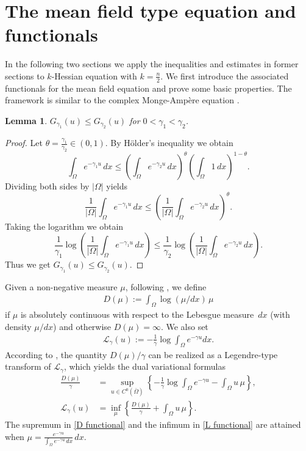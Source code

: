 \documentclass[11pt]{amsart}
\numberwithin{equation}{section}
\newtheorem{lemma}[theorem]{Lemma}
\numberwithin{equation}{section}
\begin{document}
\vskip 20pt

\section{The mean field type equation and functionals}\label{mean-field eq}

In the following two sections we apply the inequalities and estimates in former sections to 
$k$-Hessian equation with $k=\frac{n}{2}$. We first introduce the associated functionals for the mean field equation and prove some basic properties. The framework is similar to the complex Monge-Amp\`ere equation \cite{BB}.

\begin{lemma}\label{increase of G}
$G_{\gamma_1}(u)\le G_{\gamma_2}(u)$ for $0 <\gamma_1 < \gamma_2$.
\end{lemma}
\begin{proof}
 Let $\theta = \frac{\gamma_1}{\gamma_2} \in (0,1)$. 
	By H\"older's inequality  we obtain
	\[
	\int_\Omega e^{-\gamma_1 u}\, dx
	\le \left( \int_\Omega e^{-\gamma_2 u}\, dx \right)^\theta \left( \int_\Omega 1\, dx \right)^{1-\theta}.
	\]
	Dividing both sides by $|\Omega|$ yields
	\[
	\frac{1}{|\Omega|} \int_\Omega e^{-\gamma_1 u}\, dx  \le \left( \frac{1}{|\Omega|} \int_\Omega e^{-\gamma_2 u}\,dx  \right)^\theta.
	\]
	Taking the logarithm we obtain
	\[
	\frac{1}{\gamma_1} \log\left( \frac{1}{|\Omega|} \int_\Omega e^{-\gamma_1 u}\,dx  \right) \le \frac{1}{\gamma_2} \log\left( \frac{1}{|\Omega|} \int_\Omega e^{-\gamma_2 u}\,dx  \right).
	\]
Thus we get $G_{\gamma_1}(u)\le G_{\gamma_2}(u)$. 
\end{proof}

Given a non-negative measure $\mu$, following \cite{BB}, we define
\begin{align*}
	D(\mu):=\int_{\Omega} \log (\mu/dx) \,\mu
\end{align*} 
if $\mu$ is absolutely continuous with respect to the Lebesgue measure~$dx$ (with density $\mu/dx$) and otherwise $D(\mu)=\infty$. We also set
\begin{align*}
\mathcal{L}_{\gamma}(u):=-\frac{1}{\gamma}\log \int_{\Omega}e^{-\gamma u}dx.
\end{align*}
According to \cite{Ber13}, the quantity $D(\mu)/\gamma$ can be realized as a Legendre-type transform of $\mathcal{L}_{\gamma}$, which yields the dual variational formulas
\begin{align}
\frac{	D(\mu)}{\gamma}&=\sup_{u\in C^0(\bar{\Omega})}\left\{-\frac{1}{\gamma}\log \int_{\Omega}e^{-\gamma u}-\int_\Omega u\,\mu\right\}, \label{D functional}\\[5pt]
\mathcal{L}_{\gamma}(u)&=\inf_{\mu} \left\{\frac{	D(\mu)}{\gamma}+\int_\Omega u\,\mu\right\}. \label{L functional}
\end{align}
The supremum in \eqref{D functional} and the infimum in \eqref{L functional} are attained when
$\displaystyle \mu = \frac{e^{-\gamma u}}{\int_{\Omega} e^{-\gamma u}\,dx}\,dx$.
\end{document}
